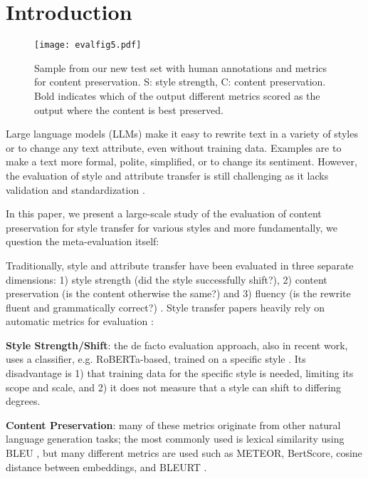\section{Introduction}

\begin{figure}[t]
    \centering
    \texttt{[image: evalfig5.pdf]}
    \caption{Sample from our new test set with human annotations and metrics for content preservation. S: style strength, C: content preservation. Bold indicates which of the output different metrics scored as the output where the content is best preserved. }
    \label{fig:sample}
\end{figure}

Large language models (LLMs) make it easy to rewrite text in a variety of styles or to change any text attribute, even without training data. Examples are to make a text more formal, polite, simplified, or to change its sentiment. However, the evaluation of style and attribute transfer is still challenging as it lacks validation and standardization \cite{ostheimer-etal-2023-call,briakou-etal-2021-review}. 

 In this paper, we present a large-scale study of the evaluation of content preservation for style transfer for various styles and more fundamentally, we question the meta-evaluation itself: 

Traditionally, style and attribute transfer have been evaluated in three separate dimensions: 1) style strength (did the style successfully shift?),  2) content preservation (is the content otherwise the same?) and 3) fluency (is the rewrite fluent and grammatically correct?) \cite{jin-etal-2022-deep}. Style transfer papers heavily rely on automatic metrics for evaluation \cite{ostheimer-etal-2023-call}:    

\textbf{Style Strength/Shift}: the de facto evaluation approach, also in recent work, uses a classifier, e.g. RoBERTa-based, trained on a specific style \cite{ lai-etal-2024-style,hallinan-etal-2023-steer,han-etal-2024-disentangled,mukherjee-etal-2024-large-language,liu2024adaptive,luo-etal-2023-prompt,zeng2024bat}. Its disadvantage is 1) that training data for the specific style is needed, limiting its scope and scale, and 2) it does not measure that a style can shift to differing degrees.  %

\textbf{Content Preservation}: many of these metrics originate from other natural language generation tasks; the most commonly used is lexical similarity using BLEU \cite{ostheimer-etal-2023-call,jin-etal-2022-deep}, but many different metrics are used such as METEOR, BertScore, cosine distance between embeddings, and BLEURT \cite{ostheimer-etal-2023-call}.

